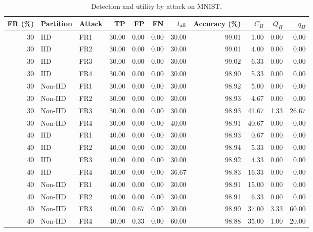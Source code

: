 \begin{table}[t]
\centering\footnotesize\setlength{\tabcolsep}{4pt}
\caption{Detection and utility by attack on MNIST.}\label{tab:detail-mnist}
\begin{tabular}{rllrrrrrrrr}
\toprule
FR (\%) & Partition & Attack & TP & FP & FN & $t_{\rm all}$ & Accuracy (\%) & $C_H$ & $Q_H$ & $q_H$ \\
\midrule
30 & IID & FR1 & 30.00 & 0.00 & 0.00 & 30.00 & 99.01 & 1.00 & 0.00 & 0.00 \\
30 & IID & FR2 & 30.00 & 0.00 & 0.00 & 30.00 & 99.01 & 4.00 & 0.00 & 0.00 \\
30 & IID & FR3 & 30.00 & 0.00 & 0.00 & 30.00 & 99.02 & 6.33 & 0.00 & 0.00 \\
30 & IID & FR4 & 30.00 & 0.00 & 0.00 & 30.00 & 98.90 & 5.33 & 0.00 & 0.00 \\
30 & Non-IID & FR1 & 30.00 & 0.00 & 0.00 & 30.00 & 98.92 & 5.00 & 0.00 & 0.00 \\
30 & Non-IID & FR2 & 30.00 & 0.00 & 0.00 & 30.00 & 98.93 & 4.67 & 0.00 & 0.00 \\
30 & Non-IID & FR3 & 30.00 & 0.00 & 0.00 & 30.00 & 98.93 & 41.67 & 1.33 & 26.67 \\
30 & Non-IID & FR4 & 30.00 & 0.00 & 0.00 & 40.00 & 98.91 & 40.67 & 0.00 & 0.00 \\
\midrule
40 & IID & FR1 & 40.00 & 0.00 & 0.00 & 30.00 & 98.93 & 0.67 & 0.00 & 0.00 \\
40 & IID & FR2 & 40.00 & 0.00 & 0.00 & 30.00 & 98.94 & 5.33 & 0.00 & 0.00 \\
40 & IID & FR3 & 40.00 & 0.00 & 0.00 & 30.00 & 98.92 & 4.33 & 0.00 & 0.00 \\
40 & IID & FR4 & 40.00 & 0.00 & 0.00 & 36.67 & 98.83 & 16.33 & 0.00 & 0.00 \\
40 & Non-IID & FR1 & 40.00 & 0.00 & 0.00 & 30.00 & 98.91 & 15.00 & 0.00 & 0.00 \\
40 & Non-IID & FR2 & 40.00 & 0.00 & 0.00 & 30.00 & 98.91 & 6.33 & 0.00 & 0.00 \\
40 & Non-IID & FR3 & 40.00 & 0.67 & 0.00 & 30.00 & 98.90 & 37.00 & 3.33 & 60.00 \\
40 & Non-IID & FR4 & 40.00 & 0.33 & 0.00 & 60.00 & 98.88 & 35.00 & 1.00 & 20.00 \\
\bottomrule
\end{tabular}
\end{table}
